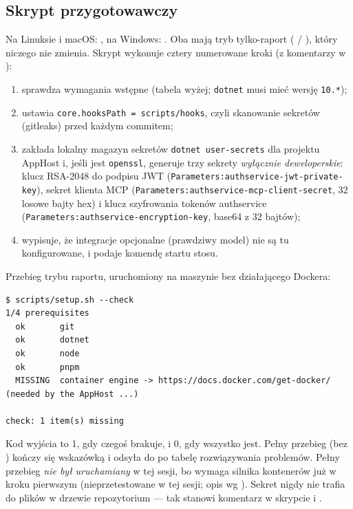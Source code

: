 {\subsection{Skrypt przygotowawczy}

Na Linuksie i macOS: , na Windows:
. Oba mają tryb tylko-raport ( /
), który niczego nie zmienia. Skrypt wykonuje cztery numerowane
kroki (z komentarzy w ):

\begin{enumerate}[leftmargin=*,itemsep=2pt]
  \item sprawdza wymagania wstępne (tabela wyżej; \texttt{dotnet} musi mieć
        wersję \texttt{10.*});
  \item ustawia \texttt{core.\allowbreak{}hooksPath = scripts/\allowbreak{}hooks}, czyli skanowanie
        sekretów (gitleaks) przed każdym commitem;
  \item zakłada lokalny magazyn sekretów \texttt{dotnet user-\allowbreak{}secrets} dla
        projektu AppHost i, jeśli jest \texttt{openssl}, generuje trzy
        sekrety \emph{wyłącznie deweloperskie}: klucz RSA-2048 do podpisu JWT
        (\texttt{Parameters:\allowbreak{}authservice-\allowbreak{}jwt-\allowbreak{}private-\allowbreak{}key}), sekret klienta MCP
        (\texttt{Parameters:\allowbreak{}authservice-\allowbreak{}mcp-\allowbreak{}client-\allowbreak{}secret}, 32 losowe bajty
        hex) i klucz szyfrowania tokenów authservice
        (\texttt{Parameters:\allowbreak{}authservice-\allowbreak{}encryption-\allowbreak{}key}, base64 z 32 bajtów);
  \item wypisuje, że integracje opcjonalne (prawdziwy model) nie są tu
        konfigurowane, i podaje komendę startu stosu.
\end{enumerate}

Przebieg trybu raportu, uruchomiony na maszynie bez działającego Dockera:

\begin{Verbatim}[fontsize=\scriptsize,frame=single,framesep=2mm]
$ scripts/setup.sh --check
1/4 prerequisites
  ok       git
  ok       dotnet
  ok       node
  ok       pnpm
  MISSING  container engine -> https://docs.docker.com/get-docker/ (needed by the AppHost ...)

check: 1 item(s) missing
\end{Verbatim}

Kod wyjścia to 1, gdy czegoś brakuje, i 0, gdy wszystko jest. Pełny przebieg
(bez ) kończy się wskazówką
 i odsyła do
 po tabelę rozwiązywania problemów. Pełny przebieg
\emph{nie był uruchamiany} w tej sesji, bo wymaga silnika kontenerów już w
kroku pierwszym (nieprzetestowane w tej sesji; opis wg
). Sekret nigdy nie trafia do plików w drzewie
repozytorium --- tak stanowi komentarz w skrypcie i
.

}
